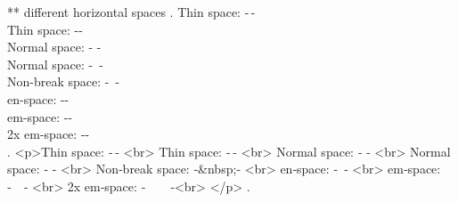 ** different horizontal spaces
.
Thin space: -\,- \\
Thin space: -\thinspace- \\
Normal space: - - \\
Normal space: -\ - \\
Non-break space: -~- \\
en-space: -\enspace- \\
em-space: -\quad- \\
2x em-space: -\qquad-\\
.
<p>Thin space: ‐ ‐ <br>
Thin space: ‐ ‐ <br>
Normal space: ‐ ‐ <br>
Normal space: ‐​ ‐ <br>
Non‐break space: ‐&nbsp;‐ <br>
en‐space: ‐ ‐ <br>
em‐space: ‐ ‐ <br>
2x em‐space: ‐  ‐<br>
</p>
.

